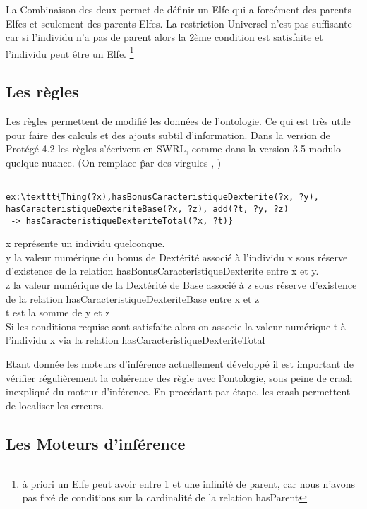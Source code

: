 \par La Combinaison des deux permet de définir un Elfe qui a forcément des parents Elfes et seulement des parents Elfes. La restriction Universel n'est pas suffisante car si l'individu n'a pas de parent alors la 2ème condition est satisfaite et l'individu peut être un Elfe.
\footnote{à priori un Elfe peut avoir entre 1 et une infinité de parent, car nous n'avons pas fixé de conditions sur la cardinalité de la relation hasParent}


\subsection{Les règles}

\par Les règles permettent de modifié les données de l'ontologie. Ce qui est très utile pour faire des calculs et des ajouts subtil d'information. Dans la version de Protégé 4.2 les règles s'écrivent en SWRL, comme dans la version 3.5 modulo quelque nuance. (On remplace \^ par des virgules , )

\begin{verbatim}

ex:\texttt{Thing(?x),hasBonusCaracteristiqueDexterite(?x, ?y),
hasCaracteristiqueDexteriteBase(?x, ?z), add(?t, ?y, ?z)
 -> hasCaracteristiqueDexteriteTotal(?x, ?t)}

\end{verbatim}

x représente un individu quelconque. 
\\y la valeur numérique du bonus de Dextérité associé à l'individu x sous réserve d'existence de la relation hasBonusCaracteristiqueDexterite entre x et y. 
\\z la valeur numérique de la Dextérité de Base associé à z sous réserve d'existence de la relation hasCaracteristiqueDexteriteBase entre x et z
\\t est la somme de y et z
\\Si les conditions requise sont satisfaite alors on associe la valeur numérique t à l'individu x via la relation hasCaracteristiqueDexteriteTotal

\par Etant donnée les moteurs d'inférence actuellement développé il est important de vérifier régulièrement la cohérence des règle avec l'ontologie, sous peine de crash inexpliqué du moteur d'inférence. En procédant par étape, les crash permettent de localiser les erreurs.

\subsection{Les Moteurs d'inférence}



